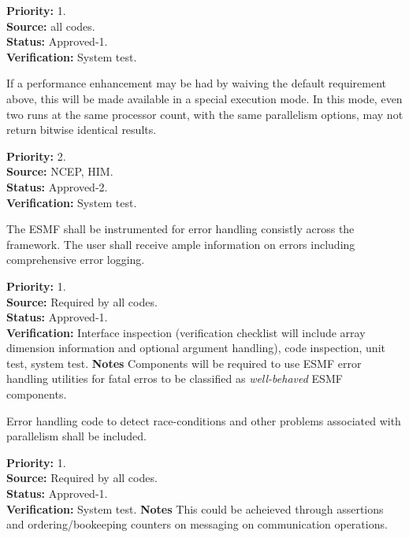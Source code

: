 \begin{reqlist}
{\bf Priority:} 1. \\
{\bf Source:} all codes. \\
{\bf Status:} Approved-1. \\
{\bf Verification:} System test.
\end{reqlist}


If a performance enhancement may be had by waiving the default
requirement above, this will be made available in a special execution
mode. In this mode, even two runs at the same processor count, with
the same parallelism options, may not return bitwise identical
results.

\begin{reqlist}
{\bf Priority:} 2. \\
{\bf Source:} NCEP, HIM. \\
{\bf Status:} Approved-2. \\
{\bf Verification:} System test.
\end{reqlist}

The ESMF shall be instrumented for error handling consistly across the
framework.  The user shall receive ample information on errors including
comprehensive error logging.
\label{req:gr:error_handling}
\begin{reqlist}
  {\bf Priority:} 1. \\
  {\bf Source:} Required by all codes. \\
  {\bf Status:} Approved-1. \\
  {\bf Verification:} Interface inspection (verification
  checklist will include array dimension information and 
  optional argument handling), code inspection, unit
  test, system test.
  {\bf Notes} Components will be required to use ESMF error
handling utilities for fatal erros to be classified as 
{\it well-behaved} ESMF components.
\end{reqlist}

Error handling code to detect race-conditions and other problems associated 
with parallelism shall be included.
\label{req:gr:error_handling}
\begin{reqlist}
  {\bf Priority:} 1. \\
  {\bf Source:} Required by all codes. \\
  {\bf Status:} Approved-1. \\
  {\bf Verification:} System test.
  {\bf Notes} This could be acheieved through assertions and ordering/bookeeping
counters on messaging on communication operations.
\end{reqlist}

